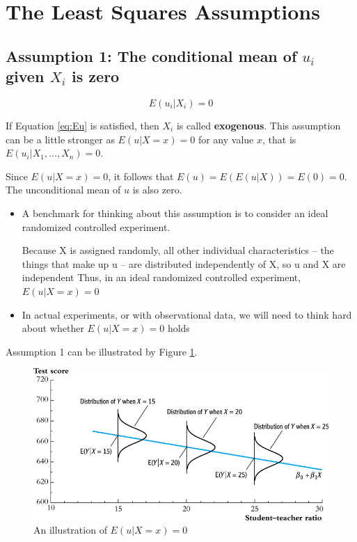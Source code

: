 \documentclass[a4paper,11pt]{article}
\begin{document}
\section{The Least Squares Assumptions}
\label{sec:orgaaa6c47}
\subsection{Assumption 1: The conditional mean of \(u_i\) given \(X_i\) is zero}
\label{sec:org98b60fd}

\begin{equation}
\label{eq:Eu}
E(u_i | X_i) = 0
\end{equation}

If Equation \ref{eq:Eu} is satisfied, then \(X_i\) is called
\textbf{exogenous}. This assumption can be a little stronger as \(E(u|X=x) = 0\)
for any value \(x\), that is \(E(u_i | X_1, \ldots, X_n) = 0\).

Since \(E(u|X=x)=0\), it follows that \(E(u)=E(E(u|X))=E(0)=0\). The
unconditional mean of \(u\) is also zero.

\begin{itemize}
\item A benchmark for thinking about this assumption is to consider an
ideal randomized controlled experiment.

Because X is assigned randomly, all other individual characteristics –
the things that make up u – are distributed independently of X, so u
and X are independent Thus, in an ideal randomized controlled
experiment, \(E(u|X = x) = 0\)

\item In actual experiments, or with observational data, we will need to
think hard about whether \(E(u|X = x) = 0\) holds
\end{itemize}

Assumption 1 can be illustrated by Figure \ref{fig:orgf2cb725}.

\begin{figure}[htbp]
\centering
\includegraphics[width=.9\linewidth]{img/fig-4-4.png}
\caption{\label{fig:orgf2cb725}
An illustration of \(E(u|X=x)=0\)}
\end{figure}
\end{document}
